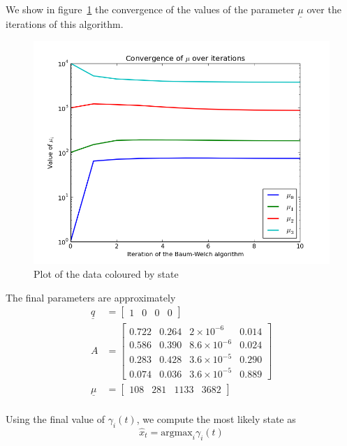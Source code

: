 \documentclass[11pt, twoside]{article}
\begin{document}
We show in figure~\ref{fig:mu-convergence} the convergence of the values of the parameter $\underline{\mu}$ over the iterations of this algorithm.
\begin{figure}[h!]
	\centering
	\includegraphics[scale = 0.4]{mu-convergence}
	\caption{Plot of the data coloured by state}
	\label{fig:mu-convergence}
\end{figure}

The final parameters are approximately
\begin{align*}
	\underline{q} &= [ \begin{array}{cccc}
	1 & 0 & 0 & 0 \end{array} ] \\
	A &= \left[ \begin{array}{cccc}
	0.722 & 0.264 & 2 \times 10^{-6} & 0.014 \\
	0.586 & 0.390 & 8.6 \times 10^{-6} & 0.024 \\
	0.283 &  0.428 & 3.6 \times 10^{-5} & 0.290 \\
	0.074 &  0.036 & 3.6 \times 10^{-5} & 0.889 \end{array} \right] \\
	\underline{\mu} &= [ \begin{array}{cccc}
	108 & 281 & 1133 & 3682 \end{array} ] \\
\end{align*}

Using the final value of $\gamma_i(t)$, we compute the most likely state as
\begin{equation*}
	\hat{x}_t = \text{argmax}_i \gamma_i(t)
\end{equation*}
\end{document}
